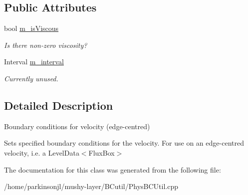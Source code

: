 \subsection*{Public Attributes}
\begin{DoxyCompactItemize}
\item 
\hypertarget{class_basic_e_c_vel_b_c_function_aa1522389e5ac482263af7757e8a381e6}{bool \hyperlink{class_basic_e_c_vel_b_c_function_aa1522389e5ac482263af7757e8a381e6}{m\-\_\-is\-Viscous}}\label{class_basic_e_c_vel_b_c_function_aa1522389e5ac482263af7757e8a381e6}

\begin{DoxyCompactList}\small\item\em Is there non-\/zero viscosity? \end{DoxyCompactList}\item 
\hypertarget{class_basic_e_c_vel_b_c_function_aed09a1041c4354b17080f48ea887caa9}{Interval \hyperlink{class_basic_e_c_vel_b_c_function_aed09a1041c4354b17080f48ea887caa9}{m\-\_\-interval}}\label{class_basic_e_c_vel_b_c_function_aed09a1041c4354b17080f48ea887caa9}

\begin{DoxyCompactList}\small\item\em Currently unused. \end{DoxyCompactList}\end{DoxyCompactItemize}


\subsection{Detailed Description}
Boundary conditions for velocity (edge-\/centred) 

Sets specified boundary conditions for the velocity. For use on an edge-\/centred velocity, i.\-e. a Level\-Data$<$\-Flux\-Box$>$ 

The documentation for this class was generated from the following file\-:\begin{DoxyCompactItemize}
\item 
/home/parkinsonjl/mushy-\/layer/\-B\-Cutil/Phys\-B\-C\-Util.\-cpp\end{DoxyCompactItemize}
